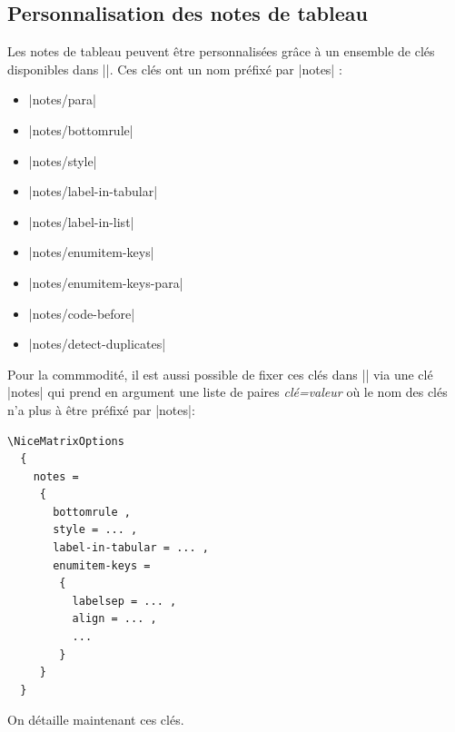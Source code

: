 \documentclass[dvipsnames]{article}%
\begin{document}
\subsection{Personnalisation des notes de tableau}


Les notes de tableau peuvent être personnalisées grâce à un ensemble de clés
disponibles dans |\NiceMatrixOptions|. Ces clés ont un nom préfixé par |notes| :
\begin{itemize}
\item |notes/para|
\item |notes/bottomrule|
\item |notes/style|
\item |notes/label-in-tabular|
\item |notes/label-in-list|
\item |notes/enumitem-keys|
\item |notes/enumitem-keys-para|
\item |notes/code-before|
\item |notes/detect-duplicates|
\end{itemize}
Pour la commmodité, il est aussi possible de fixer ces clés dans
|\NiceMatrixOptions| via une clé |notes| qui prend en argument une liste de
paires \textsl{clé=valeur} où le nom des clés n'a plus à être préfixé par
|notes|:
\begin{center}
\begin{BVerbatim}[formatcom = \small \color{gray}]
\NiceMatrixOptions
  {
    notes =
     {
       bottomrule ,
       style = ... ,
       label-in-tabular = ... ,
       enumitem-keys =
        {
          labelsep = ... ,
          align = ... ,
          ...
        }
     }
  }
\end{BVerbatim}
\end{center}


\medskip
On détaille maintenant ces clés.
\end{document}
